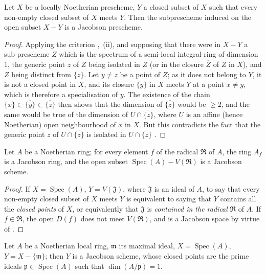 \begin{proposition}[10.5.7]
\label{IV.10.5.7}
Let $X$ be a locally Noetherian prescheme, $Y$ a closed subset of $X$ such that every non-empty closed subset of $X$ meets $Y$.
Then the subprescheme induced on the open subset $X-Y$ is a Jacobson prescheme.
\end{proposition}

\begin{proof}
Applying the criterion ,~(ii), and supposing that there were in $X-Y$ a sub-prescheme $Z$ which is the spectrum of a semi-local integral ring of dimension $1$, the generic point $z$ of $Z$ being isolated in $Z$ (or in the closure $\overline{Z}$ of $Z$ in $X$), and $Z$ being distinct from $\{z\}$.
Let $y\neq z$ be a point of $Z$; as it does not belong to $Y$, it is not a closed point in $X$, and its closure $\overline{\{y\}}$ in $X$ meets $Y$ at a point $x\neq y$, which is therefore a specialisation of $y$.
The existence of the chain $\{x\}\subset\overline{\{y\}}\subset\overline{\{z\}}$ then shows that the dimension of $\overline{\{z\}}$ would be $\geq 2$, and the same would be true of the dimension of $U\cap\overline{\{z\}}$, where $U$ is an affine (hence Noetherian) open neighbourhood of $x$ in $X$.
But this contradicts the fact that the generic point $z$ of $U\cap\overline{\{z\}}$ is isolated in $U\cap\overline{\{z\}}$ .
\end{proof}

\begin{corollary}[10.5.8]
\label{IV.10.5.8}
Let $A$ be a Noetherian ring; for every element $f$ of the radical $\mathfrak{R}$ of $A$, the ring $A_f$ is a Jacobson ring, and the open subset $\operatorname{Spec}(A)-V(\mathfrak{R})$ is a Jacobson scheme.
\end{corollary}

\begin{proof}
If $X=\operatorname{Spec}(A)$, $Y=V(\mathfrak{J})$, where $\mathfrak{J}$ is an ideal of $A$, to say that every non-empty closed subset of $X$ meets $Y$ is equivalent  to saying that $Y$ contains all the \emph{closed points} of $X$, or equivalently that $\mathfrak{J}$ is \emph{contained in the radical} $\mathfrak{R}$ of $A$.
If $f\in\mathfrak{R}$, the open $D(f)$ does not meet $V(\mathfrak{R})$, and is a Jacobson space by virtue of .
\end{proof}

\begin{corollary}[10.5.9]
\label{IV.10.5.9}
Let $A$ be a Noetherian local ring, $\mathfrak{m}$ its maximal ideal, $X=\operatorname{Spec}(A)$, $Y=X-\{\mathfrak{m}\}$; then $Y$ is a Jacobson scheme, whose closed points are the prime ideals $\mathfrak{p}\in\operatorname{Spec}(A)$ such that $\dim(A/\mathfrak{p})=1$.
\end{corollary}

